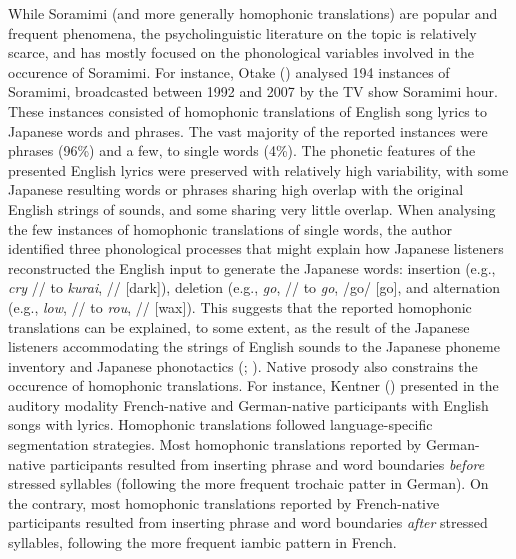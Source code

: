 \documentclass[
]{article}
\begin{document}
While Soramimi (and more generally homophonic translations) are popular
and frequent phenomena, the psycholinguistic literature on the topic is
relatively scarce, and has mostly focused on the phonological variables
involved in the occurence of Soramimi. For instance, Otake
() analysed 194 instances of
Soramimi, broadcasted between 1992 and 2007 by the TV show Soramimi
hour. These instances consisted of homophonic translations of English
song lyrics to Japanese words and phrases. The vast majority of the
reported instances were phrases (96\%) and a few, to single words (4\%).
The phonetic features of the presented English lyrics were preserved
with relatively high variability, with some Japanese resulting words or
phrases sharing high overlap with the original English strings of
sounds, and some sharing very little overlap. When analysing the few
instances of homophonic translations of single words, the author
identified three phonological processes that might explain how Japanese
listeners reconstructed the English input to generate the Japanese
words: insertion (e.g., \emph{cry} // to \emph{kurai},
// {[}dark{]}), deletion (e.g., \emph{go},
// to \emph{go}, /go/ {[}go{]}, and alternation (e.g.,
\emph{low}, // to \emph{rou}, // {[}wax{]}).
This suggests that the reported homophonic translations can be
explained, to some extent, as the result of the Japanese listeners
accommodating the strings of English sounds to the Japanese phoneme
inventory and Japanese phonotactics
(;
). Native
prosody also constrains the occurence of homophonic translations. For
instance, Kentner () presented
in the auditory modality French-native and German-native participants
with English songs with lyrics. Homophonic translations followed
language-specific segmentation strategies. Most homophonic translations
reported by German-native participants resulted from inserting phrase
and word boundaries \emph{before} stressed syllables (following the more
frequent trochaic patter in German). On the contrary, most homophonic
translations reported by French-native participants resulted from
inserting phrase and word boundaries \emph{after} stressed syllables,
following the more frequent iambic pattern in French.
\end{document}
